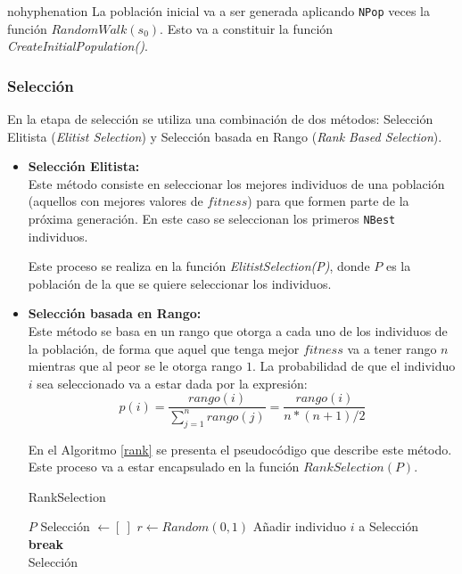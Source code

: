 \documentclass[a4paper,10pt,twocolumn]{article}
\begin{document}
\begin{hyphenrules}{nohyphenation}
La población inicial va a ser generada aplicando \texttt{NPop} veces la función $RandomWalk(s_0)$. Esto va a constituir la función \textit{CreateInitialPopulation()}.     

\subsubsection{Selección}
En la etapa de selección se utiliza una combinación de dos métodos: Selección Elitista (\textit{Elitist Selection}) y Selección basada en Rango (\textit{Rank Based Selection}).
\begin{itemize}
	\item  \textbf{Selección Elitista:}\\
	Este método consiste en seleccionar los mejores individuos de una población (aquellos con mejores valores de $fitness$) para que formen parte de la próxima generación. En este caso se seleccionan los primeros \texttt{NBest} individuos.
	
	 Este proceso se realiza en la función \textit{ElitistSelection(P)}, donde $P$ es la población de la que se quiere seleccionar los individuos. 
	
	
	\item  \textbf{Selección basada en Rango:}\\
	Este método se basa en un rango que otorga a cada uno de los individuos de la población, de forma que aquel que tenga mejor $fitness$ va a tener rango $n$ mientras que al peor se le otorga rango $1$. La probabilidad de que el individuo $i$ sea seleccionado va a estar dada por la expresión:
	$$ p(i) = \frac{rango(i)}{\sum_{j = 1}^{n}rango(j) } = \frac{rango(i)}{n*(n+1)/2} $$
	
	En el Algoritmo \ref{rank} se presenta el pseudocódigo que describe este método. Este proceso va a estar encapsulado en la función $RankSelection(P)$.
	
	\algrenewcommand{}
	\begin{algorithm}
		\caption{RankSelection}\label{rank}
		\begin{algorithmic}[1]
			\Require $P$
			\State Selección $\gets [\  ]$
				\State $r \gets Random(0,1)$
						\State Añadir individuo $i$ a Selección
						\State \textbf{break}
					\EndIf
				\EndFor
			\EndFor \\
			\Return Selección
		\end{algorithmic}
	\end{algorithm}
	  

\end{itemize}
\end{hyphenrules}
\end{document}
